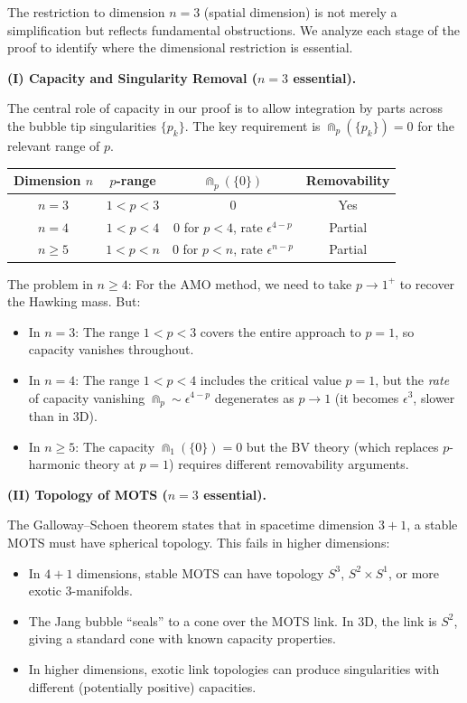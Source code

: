 \begin{remark}\label{rem:HigherDimensionalFailure}
The restriction to dimension $n = 3$ (spatial dimension) is not merely a simplification but reflects fundamental obstructions. We analyze each stage of the proof to identify where the dimensional restriction is essential.

\textbf{(I) Capacity and Singularity Removal ($n = 3$ essential).}

The central role of capacity in our proof is to allow integration by parts across the bubble tip singularities $\{p_k\}$. The key requirement is $\Cap_p(\{p_k\}) = 0$ for the relevant range of $p$.

\begin{center}
\begin{tabular}{|c|c|c|c|}
\hline
\textbf{Dimension $n$} & \textbf{$p$-range} & \textbf{$\Cap_p(\{0\})$} & \textbf{Removability} \\
\hline
$n = 3$ & $1 < p < 3$ & $0$ & Yes \\
$n = 4$ & $1 < p < 4$ & $0$ for $p < 4$, rate $\epsilon^{4-p}$ & Partial \\
$n \ge 5$ & $1 < p < n$ & $0$ for $p < n$, rate $\epsilon^{n-p}$ & Partial \\
\hline
\end{tabular}
\end{center}

The problem in $n \ge 4$: For the AMO method, we need to take $p \to 1^+$ to recover the Hawking mass. But:
\begin{itemize}
    \item In $n = 3$: The range $1 < p < 3$ covers the entire approach to $p = 1$, so capacity vanishes throughout.
    \item In $n = 4$: The range $1 < p < 4$ includes the critical value $p = 1$, but the \emph{rate} of capacity vanishing $\Cap_p \sim \epsilon^{4-p}$ degenerates as $p \to 1$ (it becomes $\epsilon^3$, slower than in 3D).
    \item In $n \ge 5$: The capacity $\Cap_1(\{0\}) = 0$ but the BV theory (which replaces $p$-harmonic theory at $p = 1$) requires different removability arguments.
\end{itemize}

\textbf{(II) Topology of MOTS ($n = 3$ essential).}

The Galloway--Schoen theorem states that in spacetime dimension $3+1$, a stable MOTS must have spherical topology. This fails in higher dimensions:
\begin{itemize}
    \item In $4+1$ dimensions, stable MOTS can have topology $S^3$, $S^2 \times S^1$, or more exotic 3-manifolds.
    \item The Jang bubble ``seals'' to a cone over the MOTS link. In 3D, the link is $S^2$, giving a standard cone with known capacity properties.
    \item In higher dimensions, exotic link topologies can produce singularities with different (potentially positive) capacities.
\end{itemize}


\end{remark}
